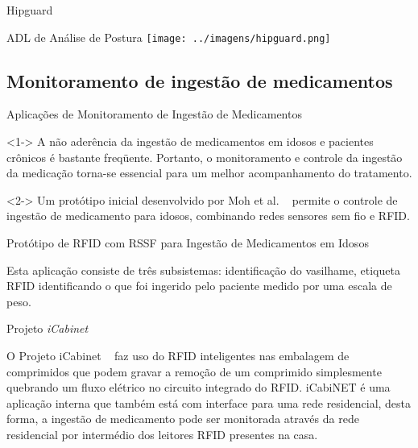 \documentclass{beamer}
\begin{document}
\begin{frame}{Hipguard} 
    \begin{block}{ADL de Análise de Postura}
      \center \texttt{[image: ../imagens/hipguard.png]}
    \end{block}
\end{frame}

\subsection{Monitoramento de ingestão de medicamentos}
\begin{frame}{Aplicações de Monitoramento de Ingestão de Medicamentos}
  \begin{block}{}<1->
   A não aderência da ingestão de medicamentos em idosos e pacientes crônicos é bastante freqüente. Portanto, o monitoramento e controle da ingestão da medicação torna-se essencial para um melhor acompanhamento do tratamento.
  \end{block}

  \begin{block}{}<2->
    Um protótipo inicial desenvolvido por Moh et al. ~\cite{Ho:2005:PRS:1080148.1080164} permite o controle de ingestão de medicamento para idosos, combinando redes sensores sem fio e RFID.
  \end{block}
\end{frame}

\begin{frame}{Protótipo de RFID com RSSF para Ingestão de Medicamentos em Idosos}
  \begin{block}{}
  Esta aplicação consiste de três subsistemas: identificação do vasilhame, etiqueta RFID identificando o que foi ingerido pelo paciente medido por uma escala de peso.
  \end{block}
\end{frame}

\begin{frame}{Projeto \textit{iCabinet}}
  \begin{block}{}
   O Projeto iCabinet ~\cite{lop08} faz uso do RFID inteligentes nas embalagem de comprimidos que podem gravar a remoção de um comprimido simplesmente quebrando um fluxo elétrico no circuito integrado do RFID. iCabiNET é uma aplicação interna que também está com interface para uma rede residencial, desta forma, a ingestão de medicamento pode ser monitorada através da rede residencial por intermédio dos leitores RFID presentes na casa.
  \end{block}
\end{frame}
\end{document}
